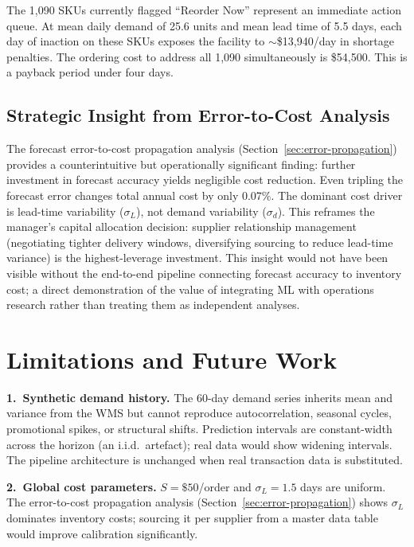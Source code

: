 \documentclass[11pt,letterpaper]{article}
\begin{document}
The 1,090 SKUs currently flagged ``Reorder Now'' represent an immediate action queue. At mean daily demand of 25.6 units and mean lead time of 5.5 days, each day of inaction on these SKUs exposes the facility to $\sim$\$13,940/day in shortage penalties. The ordering cost to address all 1,090 simultaneously is \$54,500. This is a payback period under four days.

\subsection{Strategic Insight from Error-to-Cost Analysis}

The forecast error-to-cost propagation analysis (Section~\ref{sec:error-propagation}) provides a counterintuitive but operationally significant finding: further investment in forecast accuracy yields negligible cost reduction. Even tripling the forecast error changes total annual cost by only 0.07\%. The dominant cost driver is lead-time variability ($\sigma_L$), not demand variability ($\sigma_d$). This reframes the manager's capital allocation decision: supplier relationship management (negotiating tighter delivery windows, diversifying sourcing to reduce lead-time variance) is the highest-leverage investment. This insight would not have been visible without the end-to-end pipeline connecting forecast accuracy to inventory cost; a direct demonstration of the value of integrating ML with operations research rather than treating them as independent analyses.


\section{Limitations and Future Work}
\label{sec:limitations}

\textbf{1.~Synthetic demand history.} The 60-day demand series inherits mean and variance from the WMS but cannot reproduce autocorrelation, seasonal cycles, promotional spikes, or structural shifts. Prediction intervals are constant-width across the horizon (an i.i.d.\ artefact); real data would show widening intervals. The pipeline architecture is unchanged when real transaction data is substituted.

\textbf{2.~Global cost parameters.} $S = \$50$/order and $\sigma_L = 1.5$ days are uniform. The error-to-cost propagation analysis (Section~\ref{sec:error-propagation}) shows $\sigma_L$ dominates inventory costs; sourcing it per supplier from a master data table would improve calibration significantly.
\end{document}
